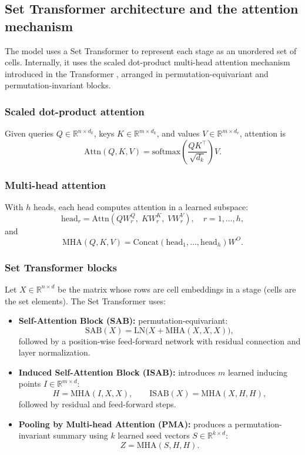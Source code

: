 \documentclass[conference]{IEEEtran}
\newcommand{\R}{\mathbb{R}}
\begin{document}
\subsection{Set Transformer architecture and the attention mechanism}

The model uses a Set Transformer \cite{Lee2018-ya} to represent each stage as an unordered set of cells. Internally, it uses the scaled dot-product multi-head attention mechanism introduced in the Transformer \cite{Vaswani2017-rb}, arranged in permutation-equivariant and permutation-invariant blocks.

\subsubsection{Scaled dot-product attention}
Given queries $Q \in \R^{n \times d_k}$, keys $K \in \R^{m \times d_k}$, and values $V \in \R^{m \times d_v}$, attention is
\[
\mathrm{Attn}(Q,K,V)
=
\mathrm{softmax}\!\left(\frac{QK^\top}{\sqrt{d_k}}\right)V.
\]

\subsubsection{Multi-head attention}
With $h$ heads, each head computes attention in a learned subspace:
\[
\mathrm{head}_r
=
\mathrm{Attn}(QW_r^Q,\;KW_r^K,\;VW_r^V),
\quad r=1,\dots,h,
\]
and
\[
\mathrm{MHA}(Q,K,V)
=
\mathrm{Concat}(\mathrm{head}_1,\dots,\mathrm{head}_h)W^O.
\]

\subsubsection{Set Transformer blocks}
Let $X \in \R^{n \times d}$ be the matrix whose rows are cell embeddings in a stage (cells are the set elements). The Set Transformer uses:
\begin{itemize}
  \item \textbf{Self-Attention Block (SAB):} permutation-equivariant:
  \[
  \mathrm{SAB}(X) = \mathrm{LN}\!\big(X + \mathrm{MHA}(X,X,X)\big),
  \]
  followed by a position-wise feed-forward network with residual connection and layer normalization.
  \item \textbf{Induced Self-Attention Block (ISAB):} introduces $m$ learned inducing points $I \in \R^{m \times d}$:
  \[
  H = \mathrm{MHA}(I,X,X), \qquad
  \mathrm{ISAB}(X) = \mathrm{MHA}(X,H,H),
  \]
  followed by residual and feed-forward steps.
  \item \textbf{Pooling by Multi-head Attention (PMA):} produces a permutation-invariant summary using $k$ learned seed vectors $S \in \R^{k \times d}$:
  \[
  Z = \mathrm{MHA}(S,H,H).
  \]
\end{itemize}
\end{document}
